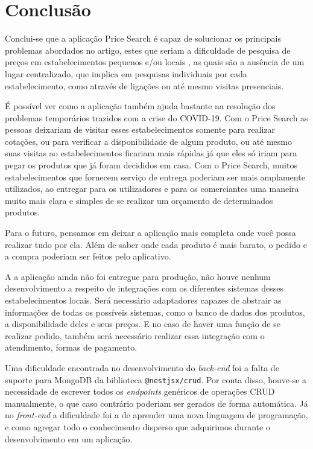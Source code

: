 \section{Conclusão}
Conclui-se que a aplicação Price Search é capaz de solucionar os principais problemas abordados no artigo, estes que seriam a dificuldade de pesquisa de preços em estabelecimentos pequenos e/ou locais , as quais são a ausência de um lugar centralizado, que implica em pesquisas individuais por cada estabelecimento, como através de ligações ou até mesmo visitas presenciais. 

É possível ver como a aplicação também ajuda bastante na resolução dos problemas temporários trazidos com a crise do COVID-19. Com o Price Search as pessoas deixariam de visitar esses estabelecimentos somente para realizar cotações, ou para verificar a disponibilidade de algum produto, ou até mesmo suas visitas ao estabelecimentos ficariam mais rápidas já que eles só iriam para pegar os produtos que já foram decididos em casa. Com o Price Search, muitos estabelecimentos que fornecem serviço de entrega poderiam ser mais amplamente utilizados, ao entregar para os utilizadores e para os comerciantes uma maneira muito mais clara e simples de se realizar um orçamento de determinados produtos.

Para o futuro, pensamos em deixar a aplicação mais completa onde você possa realizar tudo por ela. Além de saber onde cada produto é mais barato, o pedido e a compra poderiam ser feitos pelo aplicativo.

A a aplicação ainda não foi entregue para produção, não houve nenhum desenvolvimento a respeito de integrações com os diferentes sistemas desses estabelecimentos locais. Será necessário adaptadores capazes de abstrair as informações de todas os possíveis sistemas, como o banco de dados dos produtos, a disponibilidade deles e seus preços. E no caso de haver uma função de se realizar pedido, também será necessário realizar essa integração com o atendimento, formas de pagamento.

Uma dificuldade encontrada no desenvolvimento do \textit{back-end} foi a falta de suporte para MongoDB da biblioteca \texttt{@nestjsx/crud}. Por conta disso, houve-se a necessidade de escrever todos os \textit{endpoints} genéricos de operações CRUD manualmente, o que caso contrário poderiam ser gerados de forma automática. Já no \textit{front-end} a dificuldade foi a de aprender uma nova linguagem de programação, e como agregar todo o conhecimento disperso que adquirimos durante o desenvolvimento em um aplicação.

\begin{comment}
Aqui também é um comentário
\end{comment}